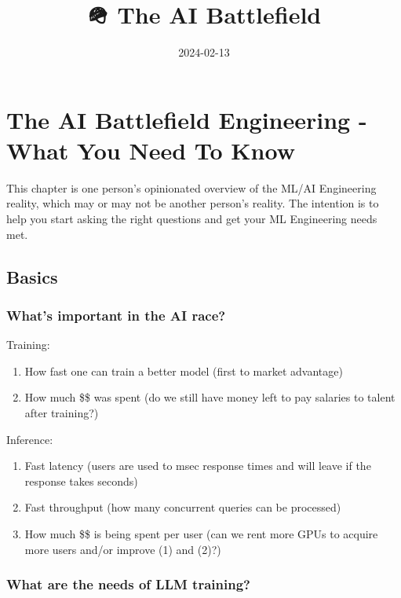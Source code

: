 \documentclass[
]{report}
\title{🪖 The AI Battlefield}
\author{}
\date{2024-02-13}
\providecommand{\tightlist}{%
  \setlength{\itemsep}{0pt}\setlength{\parskip}{0pt}}\usepackage{longtable,booktabs,array}
\begin{document}
\maketitle

\chapter{The AI Battlefield Engineering - What You Need To
Know}\label{the-ai-battlefield-engineering---what-you-need-to-know}

This chapter is one person's opinionated overview of the ML/AI
Engineering reality, which may or may not be another person's reality.
The intention is to help you start asking the right questions and get
your ML Engineering needs met.

\section{Basics}\label{basics}

\subsection{What's important in the AI
race?}\label{whats-important-in-the-ai-race}

Training:

\begin{enumerate}
\def\labelenumi{\arabic{enumi}.}
\tightlist
\item
  How fast one can train a better model (first to market advantage)
\item
  How much \$\$ was spent (do we still have money left to pay salaries
  to talent after training?)
\end{enumerate}

Inference:

\begin{enumerate}
\def\labelenumi{\arabic{enumi}.}
\tightlist
\item
  Fast latency (users are used to msec response times and will leave if
  the response takes seconds)
\item
  Fast throughput (how many concurrent queries can be processed)
\item
  How much \$\$ is being spent per user (can we rent more GPUs to
  acquire more users and/or improve (1) and (2)?)
\end{enumerate}

\subsection{What are the needs of LLM
training?}\label{what-are-the-needs-of-llm-training}
\end{document}
